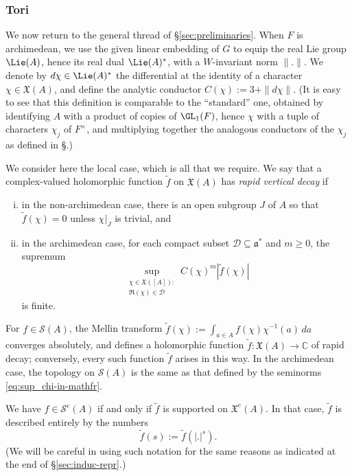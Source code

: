\subsubsection{Tori}\label{sec:tori}
We now return to the general thread of \S\ref{sec:preliminaries}.  When $F$ is archimedean, we use the given linear embedding of $G$ to equip the real Lie group $\Lie(A)$, hence its real dual $\Lie(A)^*$, with a $W$-invariant norm $\|.\|$.  We denote by $d \chi \in \Lie(A)^*$ the differential at the identity of a character $\chi \in \mathfrak{X}(A)$, and define the analytic conductor $C(\chi) := 3 + \|d \chi\|$.  (It is easy to see that this definition is comparable to the ``standard'' one, obtained by identifying $A$ with a product of copies of $\GL_1(F)$, hence $\chi$ with a tuple of characters $\chi_j$ of $F^\times$, and multiplying together the analogous conductors of the $\chi_j$ as defined in \S\cite[\S3.1.8]{michel-2009}.)

We consider here the local case, which is all that we require.  We say that a complex-valued holomorphic function $\tilde{f}$ on $\mathfrak{X}(A)$ has \emph{rapid vertical decay} if
\begin{enumerate}[(i)]
\item in the non-archimedean case, there is an open subgroup $J$ of $A$ so that $\tilde{f}(\chi) = 0$ unless $\chi|_J$ is trivial, and
\item in the archimedean case, for each compact subset $\mathcal{D} \subseteq \mathfrak{a}^*$ and $m \geq 0$, the supremum
  \begin{equation}\label{eq:sup_chi-in-mathfr}
    \sup_{
      \substack{
        \chi \in \mathfrak{X}([A]) :
        \\
        \Re(\chi) \in \mathcal{D}
      }
    }
    C(\chi)^m
    |\tilde{f}(\chi)|
  \end{equation}
  is finite.
\end{enumerate}
For $f \in \mathcal{S}(A)$, the Mellin transform $\tilde{f}(\chi) := \int_{a \in A} f(\chi) \chi^{-1}(a) \, d a$ converges absolutely, and defines a holomorphic function $\tilde{f} : \mathfrak{X}(A) \rightarrow \mathbb{C}$ of rapid decay; conversely, every such function $\tilde{f}$ arises in this way.  In the archimedean case, the topology on $\mathcal{S}(A)$ is the same as that defined by the seminorms \eqref{eq:sup_chi-in-mathfr}.  

We have $f \in \mathcal{S}^e(A)$ if and only if $\tilde{f}$ is supported on $\mathfrak{X}^e(A)$.  In that case, $\tilde{f}$ is described entirely by the numbers
\begin{equation*}
  \tilde{f}(s) := \tilde{f}(|.|^s).
\end{equation*}
(We will be careful in using such notation for the same reasons as indicated at the end of \S\ref{sec:induc-repr}.)


